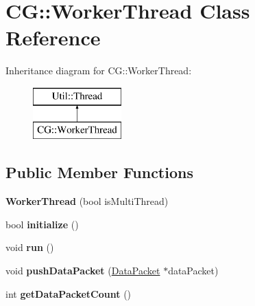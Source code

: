 \hypertarget{class_c_g_1_1_worker_thread}{}\section{CG\+:\+:Worker\+Thread Class Reference}
\label{class_c_g_1_1_worker_thread}
Inheritance diagram for CG\+:\+:Worker\+Thread\+:\begin{figure}[H]
\begin{center}
\leavevmode
\includegraphics[height=2.000000cm]{class_c_g_1_1_worker_thread}
\end{center}
\end{figure}
\subsection*{Public Member Functions}
\begin{DoxyCompactItemize}
\item 
\mbox{\label{class_c_g_1_1_worker_thread_a879675e8ca067dd8f4c86cd11323ec44}} 
{\bfseries Worker\+Thread} (bool is\+Multi\+Thread)
\item 
\mbox{\label{class_c_g_1_1_worker_thread_a1af8c7be338769312b8ea32a7426dca2}} 
bool {\bfseries initialize} ()
\item 
\mbox{\label{class_c_g_1_1_worker_thread_a86a02f86edb87d8816ecf06560e0ecf0}} 
void {\bfseries run} ()
\item 
\mbox{\label{class_c_g_1_1_worker_thread_a82afd48da88b66a6d2a3082654302c9d}} 
void {\bfseries push\+Data\+Packet} (\mbox{\hyperlink{class_c_g_1_1_data_packet}{Data\+Packet}} $\ast$data\+Packet)
\item 
\mbox{\label{class_c_g_1_1_worker_thread_aae6cf77cf618a4513fea85a043fa381f}} 
int {\bfseries get\+Data\+Packet\+Count} ()
\end{DoxyCompactItemize}
